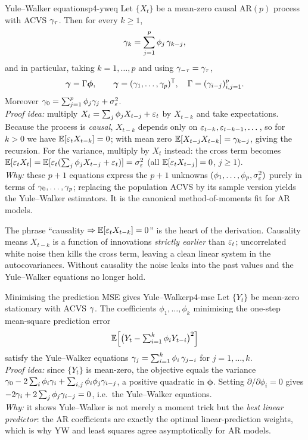 \begin{proposition}{Yule--Walker equations}{p4-yweq}
Let $\{X_t\}$ be a mean-zero causal AR$(p)$ process with ACVS $\gamma_\tau$.
Then for every $k\ge1$,
\[
\gamma_k=\sum_{j=1}^p\phi_j\,\gamma_{k-j},
\]
and in particular, taking $k=1,\dots,p$ and using $\gamma_{-\tau}=\gamma_\tau$,
\[
\boldsymbol{\gamma}=\Gamma\boldsymbol\phi,
\qquad
\boldsymbol{\gamma}=(\gamma_1,\dots,\gamma_p)^{\mathsf{T}},\quad
\Gamma=(\gamma_{i-j})_{i,j=1}^p .
\]
Moreover $\gamma_0=\sum_{j=1}^p\phi_j\gamma_j+\sigma_\varepsilon^2$.\\[2pt]
\textit{Proof idea:} multiply $X_t=\sum_j\phi_jX_{t-j}+\varepsilon_t$ by $X_{t-k}$ and
take expectations. Because the process is \emph{causal}, $X_{t-k}$ depends only
on $\varepsilon_{t-k},\varepsilon_{t-k-1},\dots$, so for $k>0$ we have $\mathbb{E}[\varepsilon_tX_{t-k}]=0$;
with mean zero $\mathbb{E}[X_{t-j}X_{t-k}]=\gamma_{k-j}$, giving the recursion. For the
variance, multiply by $X_t$ instead: the cross term becomes
$\mathbb{E}[\varepsilon_tX_t]=\mathbb{E}[\varepsilon_t(\sum_j\phi_jX_{t-j}+\varepsilon_t)]=\sigma_\varepsilon^2$ (all
$\mathbb{E}[\varepsilon_tX_{t-j}]=0$, $j\ge1$).\\
\textit{Why:} these $p+1$ equations express the $p+1$ unknowns
$(\phi_1,\dots,\phi_p,\sigma_\varepsilon^2)$ purely in terms of $\gamma_0,\dots,\gamma_p$;
replacing the population ACVS by its sample version yields the Yule--Walker
estimators. It is the canonical method-of-moments fit for AR models.
\end{proposition}

\begin{intuition}
The phrase ``causality $\Rightarrow\mathbb{E}[\varepsilon_tX_{t-k}]=0$'' is the heart of the
derivation. Causality means $X_{t-k}$ is a function of innovations
\emph{strictly earlier} than $\varepsilon_t$; uncorrelated white noise then kills the
cross term, leaving a clean linear system in the autocovariances. Without
causality the noise leaks into the past values and the Yule--Walker equations
no longer hold.
\end{intuition}

\begin{proposition}{Minimising the prediction MSE gives Yule--Walker}{p4-mse}
Let $\{Y_t\}$ be mean-zero stationary with ACVS $\gamma$. The coefficients
$\phi_1,\dots,\phi_k$ minimising the one-step mean-square prediction error
\[
\mathbb{E}\Big[\big(Y_t-\textstyle\sum_{i=1}^k\phi_iY_{t-i}\big)^2\Big]
\]
satisfy the Yule--Walker equations $\gamma_j=\sum_{i=1}^k\phi_i\,\gamma_{j-i}$ for
$j=1,\dots,k$.\\[2pt]
\textit{Proof idea:} since $\{Y_t\}$ is mean-zero, the objective equals the
variance
$\gamma_0-2\sum_i\phi_i\gamma_i+\sum_{i,j}\phi_i\phi_j\gamma_{i-j}$, a positive
quadratic in $\boldsymbol\phi$. Setting $\partial/\partial\phi_i=0$ gives
$-2\gamma_i+2\sum_j\phi_j\gamma_{i-j}=0$, i.e.\ the Yule--Walker equations.\\
\textit{Why:} it shows Yule--Walker is not merely a moment trick but the
\emph{best linear predictor}: the AR coefficients are exactly the optimal
linear-prediction weights, which is why YW and least squares agree
asymptotically for AR models.
\end{proposition}

